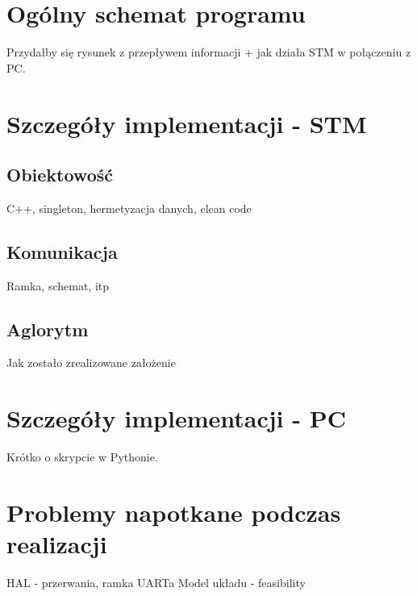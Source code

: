 \section{Ogólny schemat programu} \label{sec:scheme}
Przydałby się rysunek z przepływem informacji + jak działa STM w połączeniu z PC.

\section{Szczegóły implementacji - STM} \label{sec:details-stm}

\subsection{Obiektowość} \label{sec:objects}
C++, singleton, hermetyzacja danych, clean code

\subsection{Komunikacja} \label{sec:uart}
Ramka, schemat, itp

\subsection{Aglorytm} \label{sec:algorithm}
Jak zostało zrealizowane założenie

\section{Szczegóły implementacji - PC} \label{sec:details-pc}
Krótko o skrypcie w Pythonie.

\section{Problemy napotkane podczas realizacji} \label{sec:problems}
HAL - przerwania, ramka UARTa
Model układu - feasibility
